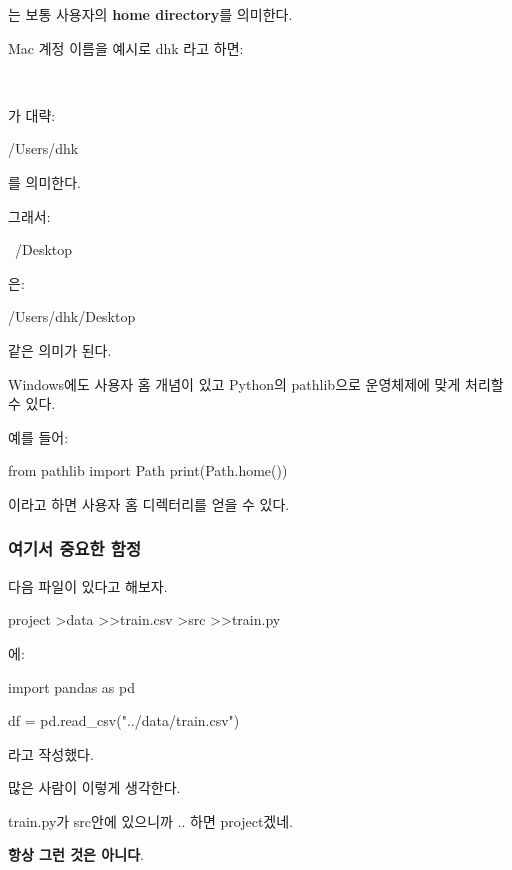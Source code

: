 는 보통 사용자의 \textbf{home directory}를 의미한다.

Mac 계정 이름을 예시로 dhk 라고 하면:

\begin{dhkzsh}
~
\end{dhkzsh}

가 대략:

\begin{dhkzsh}
/Users/dhk
\end{dhkzsh}

를 의미한다.

그래서:

\begin{dhkzsh}
~/Desktop
\end{dhkzsh}

은:

\begin{dhkzsh}
/Users/dhk/Desktop
\end{dhkzsh}

같은 의미가 된다.

Windows에도 사용자 홈 개념이 있고 Python의 pathlib으로 운영체제에 맞게 처리할 수 있다.

예를 들어:

\begin{dhkcode}
from pathlib import Path
print(Path.home())
\end{dhkcode}

이라고 하면 사용자 홈 디렉터리를 얻을 수 있다.

\subsubsection{여기서 중요한 함정}

다음 파일이 있다고 해보자.
\begin{dhkdir}
project
>data
>>train.csv
>src
>>train.py
\end{dhkdir}

에:

\begin{dhkcode}
import pandas as pd

df = pd.read_csv("../data/train.csv")
\end{dhkcode}

라고 작성했다.

많은 사람이 이렇게 생각한다.
\begin{dhksmry}[centered]
train.py가 src안에 있으니까 .. 하면 project겠네.
\end{dhksmry}

\textbf{항상 그런 것은 아니다}.


